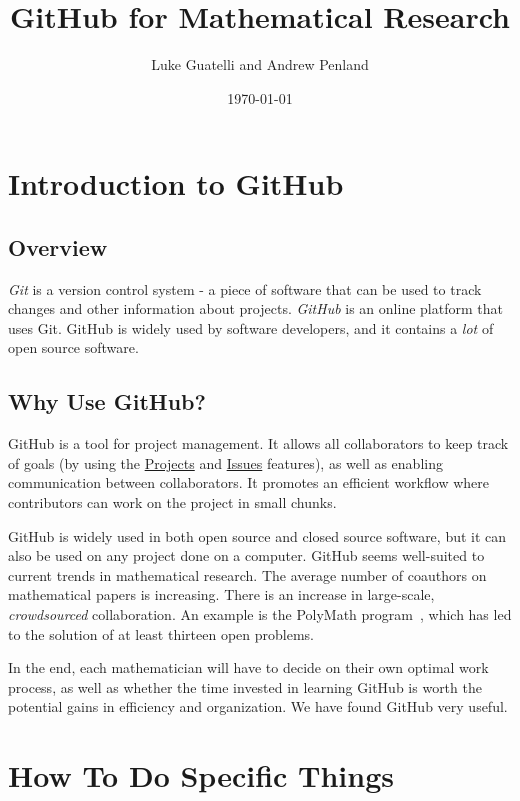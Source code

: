 \documentclass[11pt]{article}
\title{GitHub for Mathematical Research}
\author{Luke Guatelli and Andrew Penland}
\date{\today}
\begin{document}
\maketitle

\section{Introduction to GitHub}

\subsection{Overview}

\textit{Git} is a version control system - a piece of software that can be used to track changes and other information about projects. \textit{GitHub} is an online platform that uses Git. GitHub is widely used by software developers, and it contains a \textit{lot} of open source software. 

\subsection{Why Use GitHub?}

GitHub is a tool for project management. It allows all collaborators to keep track of goals (by using the \hyperlink{proj-section}{Projects} and \hyperlink{issues-section}{Issues} features), as well as enabling communication between collaborators. It promotes an efficient workflow where contributors can work on the project in small chunks.

GitHub is widely used in both open source and closed source software, but it can also be used on any project done on a computer.  GitHub seems well-suited to current trends in mathematical research. The average number of coauthors on mathematical papers is increasing. There is an increase in large-scale, \textit{crowdsourced} collaboration. An example is the PolyMath program~\cite{polymath-blog}, which has led to the solution of at least thirteen open problems. 

In the end, each mathematician will have to decide on their own optimal work process, as well as whether the time invested in learning GitHub is worth the potential gains in efficiency and organization. We have found GitHub very useful.

\section{How To Do Specific Things}
\newpage
\end{document}
